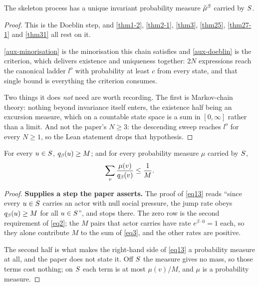 \begin{theorem}
  \label{thm1-2-skeleton}
  \leanok
  The skeleton process has a unique invariant probability measure $\tilde{\mu}^\beta$
  carried by $S$.
\end{theorem}
\begin{proof}
  \leanok
  This is the Doeblin step, and \ref{thm1-2}, \ref{thm2-1}, \ref{thm3},
  \ref{thm25}, \ref{thm27-1} and \ref{thm31} all rest on it.

  \ref{aux-minorisation} is the minorisation this chain satisfies and
  \ref{aux-doeblin} is the criterion, which delivers existence and uniqueness
  together: $2N$ expressions reach the canonical ladder $l^o$ with probability
  at least $c$ from every state, and that single bound is everything the
  criterion consumes.

  Two things it does \emph{not} need are worth recording.  The first is
  Markov-chain theory: nothing beyond invariance itself enters, the existence
  half being an excursion measure, which on a countable state space is a sum in
  $[0,\infty]$ rather than a limit.  And not the paper's
  $N \ge 3$: the descending sweep reaches $l^o$ for every $N \ge 1$, so the
  Lean statement drops that hypothesis.
\end{proof}

\begin{lemma}
  \label{aux-rate-floor}
  \leanok
  For every $u \in S$, $q_\beta(u) \ge M$; and for every probability
  measure $\mu$ carried by $S$,
  \[
    \sum_{v} \frac{\mu(v)}{q_\beta(v)} \le \frac{1}{M} .
  \]
\end{lemma}
\begin{proof}
  \leanok
  \textbf{Supplies a step the paper asserts.}  The proof of \ref{eq13} reads
  ``since every $u \in S$ carries an actor with null social pressure, the
  jump rate obeys $q_\beta(u) \ge M$ for all $u \in S$'', and stops
  there.  The zero row is the second requirement of \ref{eq2}; the $M$ pairs
  that actor carries have rate $e^{\beta \cdot 0} = 1$ each, so they alone
  contribute $M$ to the sum of \ref{eq3}, and the other rates are positive.

  The second half is what makes the right-hand side of \ref{eq13} a probability
  measure at all, and the paper does not state it.  Off $S$ the measure
  gives no mass, so those terms cost nothing; on $S$ each term is at most
  $\mu(v)/M$, and $\mu$ is a probability measure.
\end{proof}

